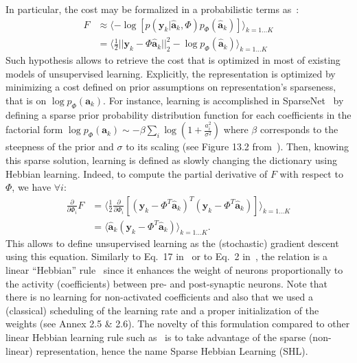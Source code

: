 \documentclass[letterpaper,final,conference,10pt]{IEEEtran}
\newcommand{\citep}[1]{\cite{#1}}
\newcommand{\coef}{\mathbf{a}} %
\newcommand{\image}{\mathbf{y}} %
\newcommand{\dico}{\Phi} %
\newcommand{\norm}[1]{|\!| #1 |\!|}
\begin{document}
In particular, the cost %
may be formalized in a probabilistic terms as~\citep{Olshausen97}:
\begin{align} 
F &\approx \langle - \log [ p(\image_k | \hat{\coef}_{k}, \dico ) p_\dico(\hat{\coef}_{k}) ]\rangle_{k = 1 \ldots K} \\
&= \langle \frac{1}{2} \norm{\image_k - \dico \hat{\coef}_{k}}_2^2 - \log p_\dico(\hat{\coef}_{k})\rangle_{k = 1 \ldots K} \label{eq:sparse_cost} \end{align}
Such hypothesis allows to retrieve the cost that is optimized in most of existing models of unsupervised learning. Explicitly, the representation is optimized by minimizing a cost defined on prior assumptions on representation's sparseness, that is on $\log p_\dico( \coef_{k} )$. For instance, learning is accomplished in {\sc SparseNet}~\citep{Olshausen97} by defining a sparse prior probability distribution function for each coefficients in the factorial form $\log p_\dico(\coef_{k}) \sim -\beta \sum_i \log ( 1 + \frac{a_i^2}{\sigma^2} )$ where $\beta$ corresponds to the steepness of the prior and $\sigma$ to its scaling (see Figure 13.2 from~\citep{Olshausen02}). Then, knowing this sparse solution, learning is defined as slowly changing the dictionary using Hebbian learning.
Indeed, to compute the partial derivative of $F$ with respect to $\dico$, we have $\forall i$:
\begin{align} 
\frac{\partial }{\partial \dico_i } F &= \langle\frac{1}{2} \frac{\partial }{\partial \dico_i }[(\image_k - \dico^T \hat{\coef}_{k})^T (\image_k - \dico^T \hat{\coef}_{k})]\rangle_{k = 1 \ldots K} \\
&= \langle\hat{\coef}_{k} (\image_k - \dico^T \hat{\coef}_{k})\rangle_{k = 1 \ldots K}.
\end{align}
This allows to define unsupervised learning as the (stochastic) gradient descent using this equation. Similarly to Eq.~17 in~\citep{Olshausen97} or to Eq.~2 in~\citep{Smith06}, the relation is a linear ``Hebbian'' rule~\citep{Hebb49} since it enhances the weight of neurons proportionally to the activity (coefficients) between pre- and post-synaptic neurons. Note that there is no learning for non-activated coefficients and also that we used a (classical) scheduling of the learning rate and a proper initialization of the weights (see Annex 2.5 \& 2.6). The novelty of this formulation compared to other linear Hebbian learning rule such as~\citep{Oja82} is to take advantage of the sparse (non-linear) representation, hence the name Sparse Hebbian Learning (SHL).
\end{document}
